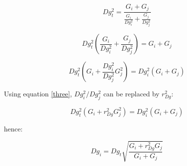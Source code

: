 \documentclass[a4paper]{article}
\begin{document}
\begin{equation*}\label{}
  Dg_t^2 = \frac{G_i + G_j} {\frac{G_i}{Dg_i^2} + \frac{G_j}{Dg_j^2}}
\end{equation*}

\begin{equation*}\label{}
  Dg_t^2(\frac{G_i}{Dg_i^2} + \frac{G_j}{Dg_j^2})= G_i + G_j
\end{equation*}

\begin{equation*}\label{}
  Dg_t^2(G_i + \frac{Dg_i^2}{Dg_j^2}G_j^2)= Dg_i^2(G_i + G_j)
\end{equation*}

\noindent Using equation \ref{three}, $Dg_i^2 / Dg_j^2$ can be replaced by $r_{Dg}^2$:

\begin{equation*}\label{}
  Dg_t^2(G_i + r_{Dg}^2G_j^2)= Dg_i^2(G_i + G_j)
\end{equation*}

\noindent hence:

\begin{equation*}\label{}
  Dg_i = Dg_t\sqrt{\frac{G_i + r_{Dg}^2G_j}{G_i + G_j}}
\end{equation*}
\end{document}
